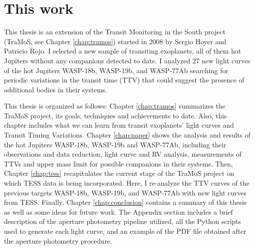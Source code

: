 \section{This work}

This thesis is an extension of the Transit Monitoring in the South project (TraMoS, see Chapter \ref{chap:tramos}) started in 2008 by Sergio Hoyer and Patricio Rojo. I selected a new sample of transiting exoplanets, all of them hot Jupiters without any companions detected to date. I analyzed 27 new light curves of the hot Jupiters WASP-18b, WASP-19b, and WASP-77Ab searching for periodic variations in the transit time (TTV) that could suggest the presence of additional bodies in their systems. 

This thesis is organized as follows: Chapter \ref{chap:tramos} summarizes the TraMoS project, its goals, techniques and achievements to date. Also, this chapter includes what we can learn from transit exoplanets' light curves and Transit Timing Variations. Chapter \ref{chap:paper} shows the analysis and results of the hot Jupiters WASP-18b, WASP-19b and WASP-77Ab, including  their observations and data reduction, light curve and RV analysis, measurements of TTVs and upper mass limit for possible companions in their systems. Then, Chapter \ref{chap:tess}  recapitulates the current stage of the TraMoS project on which TESS data is being incorporated. Here, I re-analyze the TTV curves of the previous targets WASP-18b, WASP-19b, and WASP-77Ab with new light curves from TESS. Finally, Chapter \ref{chap:conclusion} contains a summary of this thesis as well as some ideas for future work. The Appendix section includes a brief description of the aperture photometry pipeline utilized, all the Python scripts used to generate each light curve, and an example of the PDF file obtained after the aperture photometry procedure.


